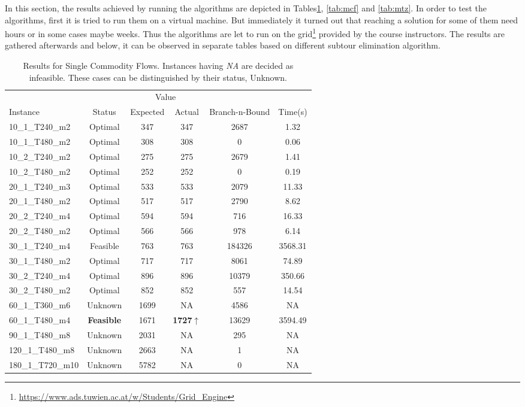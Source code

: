 In this section, the results achieved by running the algorithms are depicted in
Tables\ref{tab:scf}, \ref{tab:mcf} and \ref{tab:mtz}.
In order to test the algorithms, first it is tried to run them on a virtual
machine. But immediately it turned out that reaching a solution for some of them
need hours or in some cases maybe weeks. Thus the algorithms are let to run
on the grid\footnote{\url{https://www.ads.tuwien.ac.at/w/Students/Grid\_Engine}}
provided by the course instructors. The results are gathered afterwards and
below, it can be observed in separate tables based on different subtour
elimination algorithm.

\begin{center}

\begin{table}[H]
\centering
    \begin{tabular}{ l c c c c c }
    \hline
    &&\multicolumn{2}{c}{Value} && \\
    \cmidrule(r){3-4}
    Instance & Status & Expected & Actual & Branch-n-Bound & Time(s) \\ \hline
    10\_1\_T240\_m2 & Optimal & 347& 347  & 2687 & 1.32 \\ 
	10\_1\_T480\_m2 & Optimal & 308& 308  & 0 & 0.06 \\ 
	10\_2\_T240\_m2 & Optimal & 275& 275  & 2679 & 1.41 \\ 
	10\_2\_T480\_m2 & Optimal & 252& 252  & 0 & 0.19 \\ 
	20\_1\_T240\_m3 & Optimal & 533& 533  & 2079 & 11.33 \\ 
	20\_1\_T480\_m2 & Optimal & 517& 517  & 2790 & 8.62 \\ 
	20\_2\_T240\_m4 & Optimal & 594& 594  & 716 & 16.33 \\ 
	20\_2\_T480\_m2 & Optimal & 566& 566  & 978 & 6.14 \\ 
	30\_1\_T240\_m4 & Feasible & 763& 763  & 184326 & 3568.31 \\ 
	30\_1\_T480\_m2 & Optimal & 717& 717  & 8061 & 74.89 \\ 
	30\_2\_T240\_m4 & Optimal & 896& 896  & 10379 & 350.66 \\ 
	30\_2\_T480\_m2 & Optimal & 852& 852  & 557 & 14.54 \\ 
	60\_1\_T360\_m6 & Unknown & 1699& NA &  4586 & NA \\ 
	60\_1\_T480\_m4 & {\bf Feasible} & 1671& {\bf 1727}$\uparrow$  & 13629 &
	3594.49
	\\
	90\_1\_T480\_m8 & Unknown & 2031& NA &  295 & NA \\ 
	120\_1\_T480\_m8 & Unknown & 2663& NA & 1 & NA \\ 
	180\_1\_T720\_m10 & Unknown & 5782& NA & 0 & NA \\
    \hline
    \end{tabular}
    \caption{\label{tab:scf} Results for Single Commodity Flows. Instances
    having {\it NA} are decided as infeasible. These cases can be
    distinguished by their status, Unknown.
    }
\end{table}


\end{center}
